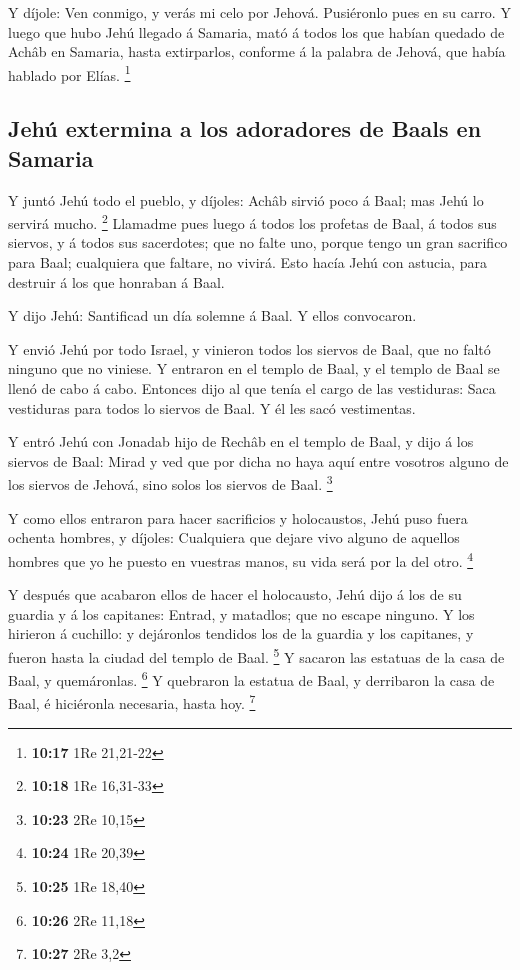  Y díjole: Ven conmigo, y verás mi celo por Jehová.
Pusiéronlo pues en su carro.  Y luego que hubo Jehú
llegado á Samaria, mató á todos los que habían quedado de Achâb en
Samaria, hasta extirparlos, conforme á la palabra de Jehová, que había
hablado por Elías. \footnote{\textbf{10:17} 1Re 21,21-22}

\hypertarget{jehuxfa-extermina-a-los-adoradores-de-baals-en-samaria}{%
\subsection{Jehú extermina a los adoradores de Baals en
Samaria}\label{jehuxfa-extermina-a-los-adoradores-de-baals-en-samaria}}

 Y juntó Jehú todo el pueblo, y díjoles: Achâb sirvió
poco á Baal; mas Jehú lo servirá mucho. \footnote{\textbf{10:18} 1Re
  16,31-33}  Llamadme pues luego á todos los profetas de
Baal, á todos sus siervos, y á todos sus sacerdotes; que no falte uno,
porque tengo un gran sacrifico para Baal; cualquiera que faltare, no
vivirá. Esto hacía Jehú con astucia, para destruir á los que honraban á
Baal.

 Y dijo Jehú: Santificad un día solemne á Baal. Y ellos
convocaron.

 Y envió Jehú por todo Israel, y vinieron todos los
siervos de Baal, que no faltó ninguno que no viniese. Y entraron en el
templo de Baal, y el templo de Baal se llenó de cabo á cabo.
 Entonces dijo al que tenía el cargo de las vestiduras:
Saca vestiduras para todos lo siervos de Baal. Y él les sacó
vestimentas.

 Y entró Jehú con Jonadab hijo de Rechâb en el templo de
Baal, y dijo á los siervos de Baal: Mirad y ved que por dicha no haya
aquí entre vosotros alguno de los siervos de Jehová, sino solos los
siervos de Baal. \footnote{\textbf{10:23} 2Re 10,15}

 Y como ellos entraron para hacer sacrificios y
holocaustos, Jehú puso fuera ochenta hombres, y díjoles: Cualquiera que
dejare vivo alguno de aquellos hombres que yo he puesto en vuestras
manos, su vida será por la del otro. \footnote{\textbf{10:24} 1Re 20,39}

 Y después que acabaron ellos de hacer el holocausto,
Jehú dijo á los de su guardia y á los capitanes: Entrad, y matadlos; que
no escape ninguno. Y los hirieron á cuchillo: y dejáronlos tendidos los
de la guardia y los capitanes, y fueron hasta la ciudad del templo de
Baal. \footnote{\textbf{10:25} 1Re 18,40}  Y sacaron las
estatuas de la casa de Baal, y quemáronlas. \footnote{\textbf{10:26} 2Re
  11,18}  Y quebraron la estatua de Baal, y derribaron la
casa de Baal, é hiciéronla necesaria, hasta hoy. \footnote{\textbf{10:27}
  2Re 3,2}

